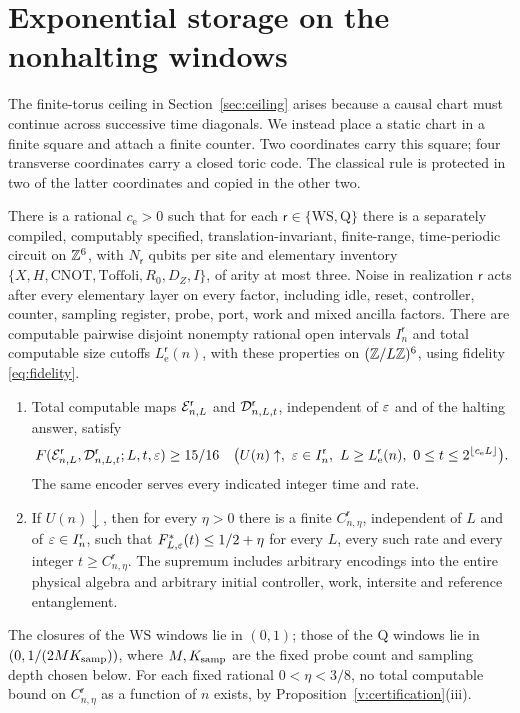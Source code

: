 \section{Exponential storage on the nonhalting windows}\label{sec:exponential}
The finite-torus ceiling in Section~\ref{sec:ceiling} arises because a
causal chart must continue across successive time diagonals. We instead
place a static chart in a finite square and attach a finite counter.
Two coordinates carry this square; four transverse coordinates carry a
closed toric code. The classical rule is protected in two of the latter
coordinates and copied in the other two.

\begin{theorem}\label{v:detailed}
There is a rational \(c_{\mathrm e}>0\) such that for each \(\mathsf r\in\{\mathrm{WS},\mathrm Q\}\) there is a separately
compiled, computably specified, translation-invariant, finite-range,
time-periodic circuit on \(\mathbb Z^6\), with \(N_{\mathsf r}\) qubits per
site and elementary inventory
\(\{X,H,\mathrm{CNOT},\mathrm{Toffoli},R_0,D_Z,I\}\), of arity at most
three. Noise in realization \(\mathsf r\) acts after every elementary
layer on every factor, including idle, reset, controller, counter, sampling register, probe, port, work and mixed ancilla factors. There are computable pairwise disjoint
nonempty rational open intervals \(I_n^{\mathsf r}\)
and total computable size cutoffs
\(L_{\mathrm e}^{\mathsf r}(n)\), with these properties on
\((\mathbb Z/L\mathbb Z)^6\), using fidelity \eqref{eq:fidelity}.
\begin{enumerate}
\item Total computable maps \(\mathcal E^{\mathsf r}_{n,L}\) and
\(\mathcal D^{\mathsf r}_{n,L,t}\), independent of \(\varepsilon\) and of the halting
answer, satisfy
\[
 F(\mathcal E^{\mathsf r}_{n,L},\mathcal D^{\mathsf r}_{n,L,t};L,t,\varepsilon)\ge15/16
 \quad\bigl(U(n)\uparrow,\ \varepsilon\in I_n^{\mathsf r},\
 L\ge L_{\mathrm e}^{\mathsf r}(n),\ 0\le t\le2^{\lfloor c_{\mathrm e}L\rfloor}\bigr).
\]
The same encoder serves every indicated integer time and rate.
\item If \(U(n)\downarrow\), then for every \(\eta>0\) there is a finite
\(C^{\mathsf r}_{n,\eta}\), independent of \(L\) and of
\(\varepsilon\in I_n^{\mathsf r}\), such that
\(F^*_{L,\varepsilon}(t)\le1/2+\eta\) for every \(L\), every such rate and
every integer \(t\ge C^{\mathsf r}_{n,\eta}\). The supremum includes
arbitrary encodings into the entire physical algebra and arbitrary
initial controller, work, intersite and reference entanglement.
\end{enumerate}
The closures of the \(\mathrm{WS}\) windows lie in \((0,1)\); those of the \(\mathrm Q\) windows
lie in \((0,1/(2MK_{\rm samp}))\), where \(M,K_{\rm samp}\) are the fixed probe count and
sampling depth chosen below. For each fixed rational \(0<\eta<3/8\),
no total computable bound on \(C^{\mathsf r}_{n,\eta}\) as a function
of \(n\) exists, by Proposition~\ref{v:certification}(iii).
\end{theorem}

